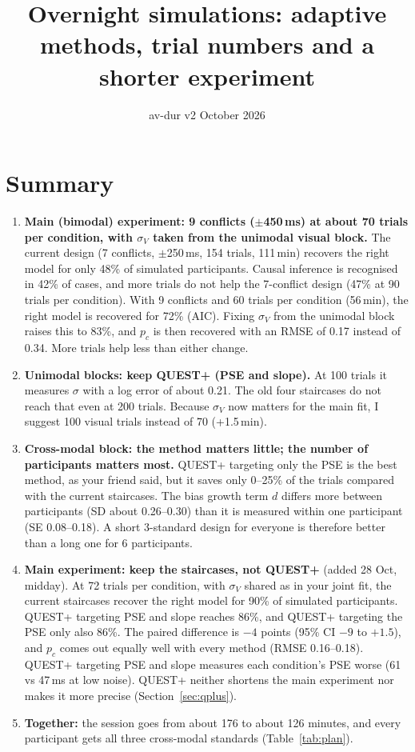 \documentclass[11pt,a4paper]{article}
\title{Overnight simulations: adaptive methods, trial numbers and a shorter experiment}
\author{av-dur v2 \quad 28 October 2026}
\date{}
\begin{document}
\maketitle
\vspace{-1.5em}

\section*{Summary}
\begin{enumerate}
\item \textbf{Main (bimodal) experiment: 9 conflicts ($\pm$450\,ms) at about 70 trials per condition, with $\sigma_V$ taken from the unimodal visual block.} The current design (7 conflicts, $\pm$250\,ms, 154 trials, 111\,min) recovers the right model for only 48\% of simulated participants. Causal inference is recognised in 42\% of cases, and more trials do not help the 7-conflict design (47\% at 90 trials per condition). With 9 conflicts and 60 trials per condition (56\,min), the right model is recovered for 72\% (AIC). Fixing $\sigma_V$ from the unimodal block raises this to 83\%, and $p_c$ is then recovered with an RMSE of 0.17 instead of 0.34. More trials help less than either change.
\item \textbf{Unimodal blocks: keep QUEST+ (PSE and slope).} At 100 trials it measures $\sigma$ with a log error of about 0.21. The old four staircases do not reach that even at 200 trials. Because $\sigma_V$ now matters for the main fit, I suggest 100 visual trials instead of 70 (+1.5\,min).
\item \textbf{Cross-modal block: the method matters little; the number of participants matters most.} QUEST+ targeting only the PSE is the best method, as your friend said, but it saves only 0--25\% of the trials compared with the current staircases. The bias growth term $d$ differs more between participants (SD about 0.26--0.30) than it is measured within one participant (SE 0.08--0.18). A short 3-standard design for everyone is therefore better than a long one for 6 participants.
\item \textbf{Main experiment: keep the staircases, not QUEST+} (added 28 Oct, midday). At 72 trials per condition, with $\sigma_V$ shared as in your joint fit, the current staircases recover the right model for 90\% of simulated participants. QUEST+ targeting PSE and slope reaches 86\%, and QUEST+ targeting the PSE only also 86\%. The paired difference is $-4$ points (95\% CI $-9$ to $+1.5$), and $p_c$ comes out equally well with every method (RMSE 0.16--0.18). QUEST+ targeting PSE and slope measures each condition's PSE worse (61 vs 47\,ms at low noise). QUEST+ neither shortens the main experiment nor makes it more precise (Section~\ref{sec:qplus}).
\item \textbf{Together:} the session goes from about 176 to about 126 minutes, and every participant gets all three cross-modal standards (Table~\ref{tab:plan}).
\end{enumerate}
\end{document}
